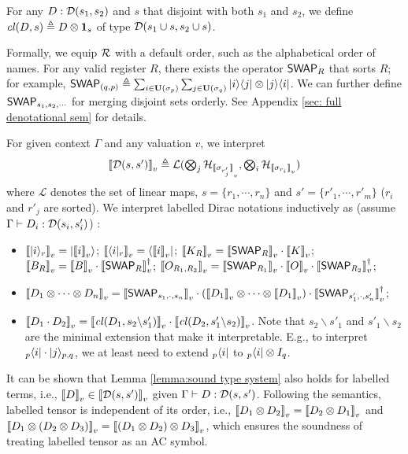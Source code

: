 \begin{definition}
  For any $D : {\mathcal{D}}(s_1,s_2)$ and $s$ that disjoint with both $s_1$ and $s_2$, we define ${\mathit{cl}}(D,s) \triangleq D\otimes \mathbf{1}_{s}$ of type ${\mathcal{D}}(s_1\cup s, s_2\cup s)$.
\end{definition}
Formally, we equip $\mathcal{R}$ with a default order, such as the alphabetical order of names. For any valid register $R$, there exists the operator ${\mathsf{SWAP}}_R$ that sorts $R$; for example, ${\mathsf{SWAP}}_{(q,p)} \triangleq \sum_{i\in \mathbf{U}(\sigma_p)}\sum_{j\in \mathbf{U}(\sigma_q)}|i\rangle\langle j|\otimes |j\rangle\langle i|$. We can further define ${\mathsf{SWAP}}_{s_1,s_2,\cdots}$ for merging disjoint sets orderly. See Appendix \ref{sec: full denotational sem} for details.

For given context $\Gamma$ and any valuation $v$,
we interpret 
$$\mbox{${\llbracket {\mathcal{D}}(s,s') \rrbracket}_v \triangleq \mathcal{L}(\bigotimes_{j}{\mathcal{H}}_{{\llbracket \sigma_{r'_j} \rrbracket}_v}, \bigotimes_{i}{\mathcal{H}}_{{\llbracket \sigma_{r_i} \rrbracket}_v})$}$$ where $\mathcal{L}$ denotes the set of linear maps, 
$s = \{r_1,\cdots,r_n\}$ and $s' = \{r'_1,\cdots,r'_m\}$ ($r_i$ and $r'_j$ are sorted).
We interpret labelled Dirac notations inductively as (assume $\Gamma\vdash D_i : {\mathcal{D}}(s_i,s'_i)$) :
\begin{itemize}
  \item ${\llbracket |i\rangle_r \rrbracket}_v = |{\llbracket i \rrbracket}_v\rangle$;\quad 
        ${\llbracket \langle i|_r \rrbracket}_v = \langle{\llbracket i \rrbracket}_v|$;\quad  
        ${\llbracket K_R \rrbracket}_v = {\llbracket {\mathsf{SWAP}}_R \rrbracket}_v \cdot {\llbracket K \rrbracket}_v$; \\
        ${\llbracket B_R \rrbracket}_v = {\llbracket B \rrbracket}_v\cdot {\llbracket {\mathsf{SWAP}}_R \rrbracket}_v^\dagger$;\quad
        ${\llbracket O_{R_1,R_2} \rrbracket}_v = {\llbracket {\mathsf{SWAP}}_{R_1} \rrbracket}_v\cdot {\llbracket O \rrbracket}_v\cdot {\llbracket {\mathsf{SWAP}}_{R_2} \rrbracket}_v^\dagger$;
  \item ${\llbracket D_1\otimes \cdots \otimes D_n \rrbracket}_v = {\llbracket {\mathsf{SWAP}}_{s_1,\cdot,s_n} \rrbracket}_v\cdot ({\llbracket D_1 \rrbracket}_v\otimes \cdots \otimes {\llbracket D_1 \rrbracket}_v)\cdot {\llbracket {\mathsf{SWAP}}_{s'_1,\cdot,s'_n} \rrbracket}_v^\dagger$;
  \item ${\llbracket D_1\cdot D_2 \rrbracket}_v = {\llbracket {\mathit{cl}}(D_1, s_2\backslash s'_1) \rrbracket}_v\cdot {\llbracket {\mathit{cl}}(D_2, s'_1\backslash s_2) \rrbracket}_v$. Note that $s_2\backslash s'_1$ and $s'_1\backslash s_2$ are the minimal extension that make it interpretable. E.g., to interpret ${}_p\langle i|\cdot |j\rangle_{p,q}$, we at least need to extend ${}_p\langle i|$ to ${}_p\langle i|\otimes I_{q}$.
\end{itemize}
It can be shown that Lemma \ref{lemma:sound type system} also holds for labelled terms, i.e., ${\llbracket D \rrbracket}_v \in {\llbracket {\mathcal{D}}(s,s') \rrbracket}_v$ given $\Gamma\vdash D : {\mathcal{D}}(s,s')$. Following the semantics, labelled tensor is independent of its order, i.e., ${\llbracket D_1\otimes D_2 \rrbracket}_v = {\llbracket D_2\otimes D_1 \rrbracket}_v$ and ${\llbracket D_1\otimes (D_2\otimes D_3) \rrbracket}_v = {\llbracket (D_1\otimes D_2)\otimes D_3 \rrbracket}_v$, which ensures the soundness of treating labelled tensor as an AC symbol.

